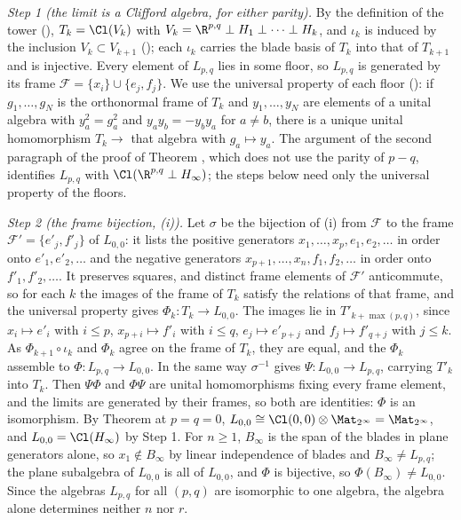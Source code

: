 \emph{Step 1 (the limit is a Clifford algebra, for either parity).} By the definition of the tower (), $T_{k} = \Cl(V_{k})$ with $V_{k} = \R^{p,q} \perp H_{1} \perp \cdots \perp H_{k}$, and $\iota_{k}$ is induced by the inclusion $V_{k} \subset V_{k+1}$ (); each $\iota_{k}$ carries the blade basis of $T_{k}$ into that of $T_{k+1}$ and is injective. Every element of $L_{p,q}$ lies in some floor, so $L_{p,q}$ is generated by its frame $\mathcal{F} = \{x_{i}\} \cup \{e_{j}, f_{j}\}$. We use the universal property of each floor (): if $g_{1}, \dots, g_{N}$ is the orthonormal frame of $T_{k}$ and $y_{1}, \dots, y_{N}$ are elements of a unital algebra with $y_{a}^{2} = g_{a}^{2}$ and $y_{a}y_{b} = -y_{b}y_{a}$ for $a \ne b$, there is a unique unital homomorphism $T_{k} \to$ that algebra with $g_{a} \mapsto y_{a}$. The argument of the second paragraph of the proof of Theorem , which does not use the parity of $p - q$, identifies $L_{p,q}$ with $\Cl(\R^{p,q} \perp H_{\infty})$; the steps below need only the universal property of the floors.

\emph{Step 2 (the frame bijection, (i)).} Let $\sigma$ be the bijection of (i) from $\mathcal{F}$ to the frame $\mathcal{F}' = \{e'_{j}, f'_{j}\}$ of $L_{0,0}$: it lists the positive generators $x_{1}, \dots, x_{p}, e_{1}, e_{2}, \dots$ in order onto $e'_{1}, e'_{2}, \dots$ and the negative generators $x_{p+1}, \dots, x_{n}, f_{1}, f_{2}, \dots$ in order onto $f'_{1}, f'_{2}, \dots$. It preserves squares, and distinct frame elements of $\mathcal{F}'$ anticommute, so for each $k$ the images of the frame of $T_{k}$ satisfy the relations of that frame, and the universal property gives $\Phi_{k} \colon T_{k} \to L_{0,0}$. The images lie in $T'_{k + \max(p,q)}$, since $x_{i} \mapsto e'_{i}$ with $i \le p$, $x_{p+i} \mapsto f'_{i}$ with $i \le q$, $e_{j} \mapsto e'_{p+j}$ and $f_{j} \mapsto f'_{q+j}$ with $j \le k$. As $\Phi_{k+1} \circ \iota_{k}$ and $\Phi_{k}$ agree on the frame of $T_{k}$, they are equal, and the $\Phi_{k}$ assemble to $\Phi \colon L_{p,q} \to L_{0,0}$. In the same way $\sigma^{-1}$ gives $\Psi \colon L_{0,0} \to L_{p,q}$, carrying $T'_{k}$ into $T_{k}$. Then $\Psi\Phi$ and $\Phi\Psi$ are unital homomorphisms fixing every frame element, and the limits are generated by their frames, so both are identities: $\Phi$ is an isomorphism. By Theorem  at $p = q = 0$, $L_{0,0} \cong \Cl(0,0) \otimes \Mat_{2^{\infty}} = \Mat_{2^{\infty}}$, and $L_{0,0} = \Cl(H_{\infty})$ by Step 1. For $n \ge 1$, $B_{\infty}$ is the span of the blades in plane generators alone, so $x_{1} \notin B_{\infty}$ by linear independence of blades and $B_{\infty} \ne L_{p,q}$; the plane subalgebra of $L_{0,0}$ is all of $L_{0,0}$, and $\Phi$ is bijective, so $\Phi(B_{\infty}) \ne L_{0,0}$. Since the algebras $L_{p,q}$ for all $(p,q)$ are isomorphic to one algebra, the algebra alone determines neither $n$ nor $r$.

